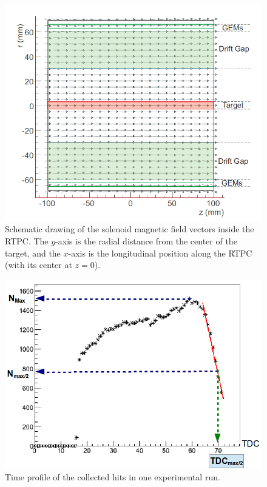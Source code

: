 \documentclass[twocolumn,showpacs,superscriptaddress,groupedaddress]{revtex4}
\begin{document}
\begin{figure}[tb]
   \centering
   \includegraphics[scale=0.35]{fig/B_MAP.png}
   \caption[]{Schematic drawing of the solenoid magnetic field vectors inside the 
   RTPC. The $y$-axis is the radial distance from the center of the target, and the
   $x$-axis is the longitudinal position along the RTPC (with its center at $z=0$).} 
\label{fig:B_MAP}
\end{figure}

\begin{figure}[tb]
   \centering
   \includegraphics[scale=0.3]{fig/TDC_profile.png}
   \caption[]{Time profile of the collected hits in one experimental run.  } 
   \label{fig:TDC_profile}
\end{figure}
\end{document}
